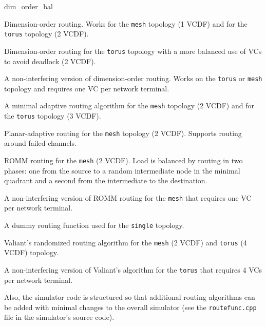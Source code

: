 \documentclass[11pt]{article}
\begin{document}
\begin{opt_list}{dim\_order\_bal}

\item[dim\_order] Dimension-order routing.  Works for the
\texttt{mesh} topology (1 VCDF) and for the \texttt{torus} topology (2
VCDF).

\item[dim\_order\_bal] Dimension-order routing for the
\texttt{torus} topology with a more balanced use of VCs to
avoid deadlock (2 VCDF).

\item[dim\_order\_ni] A non-interfering version of
dimension-order routing.  Works on the \texttt{torus} or \texttt{mesh}
topology and requires one VC per network terminal.

\item[min\_adapt] A minimal adaptive routing algorithm for
the \texttt{mesh} topology (2 VCDF) and for the \texttt{torus}
topology (3 VCDF).

\item[planar\_adapt] Planar-adaptive routing for the
\texttt{mesh} topology (2 VCDF).  Supports routing around failed channels.

\item[romm] ROMM routing for the \texttt{mesh} (2 VCDF).
Load is balanced by routing in two phases: one from the source to a
random intermediate node in the minimal quadrant and a second from the
intermediate to the destination.

\item[romm\_ni] A non-interfering version of ROMM routing for
the \texttt{mesh} that requires one VC per network terminal.

\item[single] A dummy routing function used for the
\texttt{single} topology.

\item[valiant] Valiant's randomized routing algorithm for the
\texttt{mesh} (2 VCDF) and \texttt{torus} (4 VCDF) topology.

\item[valiant\_ni] A non-interfering version of Valiant's algorithm
for the \texttt{torus} that requires 4 VCs per network terminal.

\end{opt_list}

Also, the simulator code is structured so that additional routing
algorithms can be added with minimal changes to the overall simulator
(see the \texttt{routefunc.cpp} file in the simulator's source code).
\end{document}
